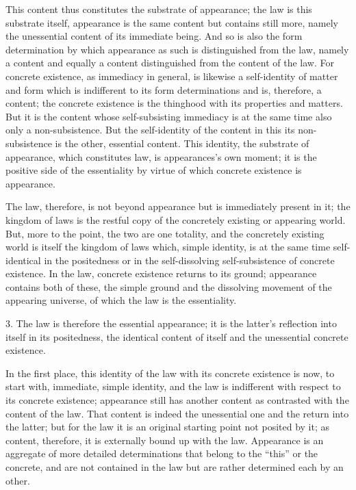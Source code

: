 This content thus constitutes the substrate of appearance;
the law is this substrate itself,
appearance is the same content but contains still more,
namely the unessential content of its immediate being.
And so is also the form determination by which appearance as such is
distinguished from the law, namely a content and equally a content
distinguished from the content of the law.
For concrete existence, as immediacy in general,
is likewise a self-identity of matter and form which is indifferent to its
form determinations and is, therefore, a content;
the concrete existence is the thinghood with its properties and matters.
But it is the content whose self-subsisting immediacy is
at the same time also only a non-subsistence.
But the self-identity of the content in this its non-subsistence
is the other, essential content.
This identity, the substrate of appearance, which constitutes law,
is appearances's own moment;
it is the positive side of the essentiality
by virtue of which concrete existence is appearance.

The law, therefore, is not beyond appearance
but is immediately present in it;
the kingdom of laws is the restful copy
of the concretely existing or appearing world.
But, more to the point, the two are one totality,
and the concretely existing world is itself
the kingdom of laws which, simple identity,
is at the same time self-identical in the positedness
or in the self-dissolving self-subsistence of concrete existence.
In the law, concrete existence returns to its ground;
appearance contains both of these, the simple ground
and the dissolving movement of the appearing universe,
of which the law is the essentiality.

3. The law is therefore the essential appearance;
it is the latter's reflection into itself in its positedness,
the identical content of itself and the unessential concrete existence.

In the first place, this identity of the law
with its concrete existence is now, to start with,
immediate, simple identity, and the law is indifferent
with respect to its concrete existence;
appearance still has another content as
contrasted with the content of the law.
That content is indeed the unessential one
and the return into the latter;
but for the law it is an original starting point not posited by it;
as content, therefore, it is externally bound up with the law.
Appearance is an aggregate of more detailed determinations
that belong to the “this” or the concrete,
and are not contained in the law
but are rather determined each by an other.

